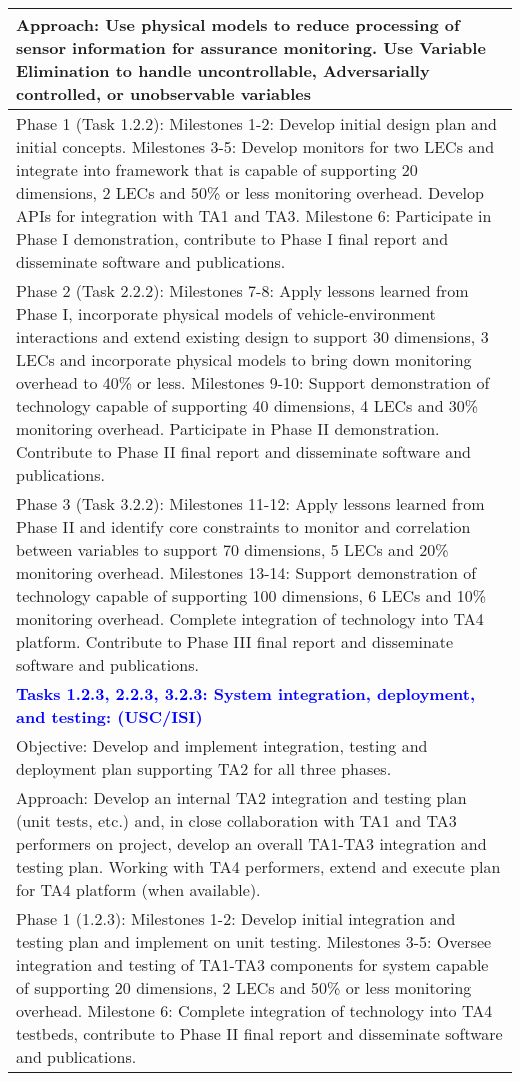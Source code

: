 {\begin{longtable} {|p{\textwidth} | }
Approach: Use physical models to reduce processing of sensor information for assurance monitoring. Use Variable Elimination to handle uncontrollable, Adversarially controlled, or unobservable variables \\ \hline
Phase 1 (Task 1.2.2): Milestones 1-2:  Develop initial design plan and initial concepts.  Milestones 3-5:  Develop monitors for two LECs and integrate into framework that is capable of supporting 20 dimensions, 2 LECs and 50\% or less monitoring overhead.  Develop APIs for integration with TA1 and TA3. Milestone 6: Participate in Phase I demonstration, contribute to Phase I final report and disseminate software and publications. \\ \hline
Phase 2 (Task 2.2.2): Milestones 7-8:  Apply lessons learned from Phase I, incorporate physical models of vehicle-environment interactions and extend existing design to support 30 dimensions, 3 LECs and incorporate physical models to bring down monitoring overhead to 40\% or less.   Milestones 9-10:  Support demonstration of technology capable of supporting 40 dimensions, 4 LECs and 30\% monitoring overhead.  Participate in Phase II demonstration.  Contribute to Phase II final report and disseminate software and publications. \\ \hline
Phase 3 (Task 3.2.2): Milestones 11-12:  Apply lessons learned from Phase II and identify core constraints to monitor and correlation between variables to support 70 dimensions, 5 LECs and 20\% monitoring overhead.  Milestones 13-14:  Support demonstration of technology capable of supporting 100 dimensions, 6 LECs and 10\% monitoring overhead.  Complete integration of technology into TA4 platform.  Contribute to Phase III final report and disseminate software and publications. \\ \hline
\textcolor{blue} {\footnotesize {\textbf{Tasks 1.2.3, 2.2.3, 3.2.3: System integration, deployment, and testing: (USC/ISI)}}} \\ \hline
Objective: Develop and implement integration, testing and deployment plan supporting TA2 for all three phases. \\ \hline
Approach: Develop an internal TA2 integration and testing plan (unit tests, etc.) and, in close collaboration with TA1 and TA3 performers on project, develop an overall TA1-TA3 integration and testing plan.  Working with TA4 performers, extend and execute plan for TA4 platform (when available). \\ \hline
Phase 1 (1.2.3): Milestones 1-2:  Develop initial integration and testing plan and implement on unit testing.  Milestones 3-5:  Oversee integration and testing of TA1-TA3 components for system capable of supporting 20 dimensions, 2 LECs and 50\% or less monitoring overhead.   Milestone 6: Complete integration of technology into TA4 testbeds, contribute to Phase II final report and disseminate software and publications. \\ \hline

\end{longtable}}
